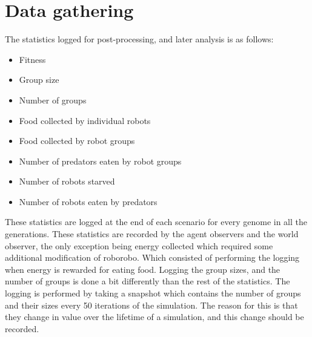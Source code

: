 \clearpage
\section{Data gathering}
The statistics logged for post-processing, and later analysis is as follows:
\begin{itemize}
	\item Fitness
	\item Group size
	\item Number of groups
	\item Food collected by individual robots
	\item Food collected by robot groups
	\item Number of predators eaten by robot groups
	\item Number of robots starved
	\item Number of robots eaten by predators
\end{itemize}
These statistics are logged at the end of each scenario for every genome in all the generations.
These statistics are recorded by the agent observers and the world observer, the only exception being energy collected which required some additional modification of roborobo.
Which consisted of performing the logging when energy is rewarded for eating food.
Logging the group sizes, and the number of groups is done a bit differently than the rest of the statistics.
The logging is performed by taking a snapshot which contains the number of groups and their sizes every 50 iterations of the simulation.
The reason for this is that they change in value over the lifetime of a simulation, and this change should be recorded.



\clearpage
